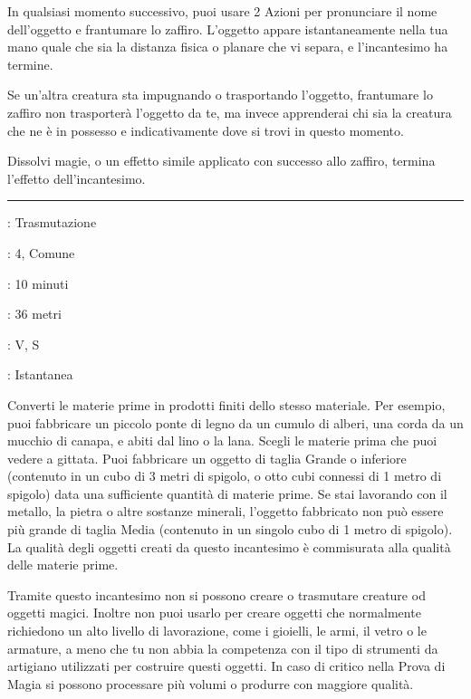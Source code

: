 \begin{multicols}{2}
In qualsiasi momento successivo, puoi usare 2 Azioni per pronunciare il nome dell'oggetto e frantumare lo zaffiro. L'oggetto appare istantaneamente nella tua mano quale che sia la distanza fisica o planare che vi separa, e l'incantesimo ha termine.

Se un'altra creatura sta impugnando o trasportando l'oggetto, frantumare lo zaffiro non trasporterà l'oggetto da te, ma invece apprenderai chi sia la creatura che ne è in possesso e indicativamente dove si trovi in questo momento.

Dissolvi magie, o un effetto simile applicato con successo allo zaffiro, termina l'effetto dell'incantesimo.

\smallskip\noindent\rule{\linewidth}{2pt} \hypertarget{Fabbricare}{}\medskip{}
\noindent
\begin{description}[noitemsep, topsep=0pt, parsep=0pt, partopsep=0pt, leftmargin=0cm, labelwidth=2.8cm]
	\item[\textbf{Lista di Magia}]: Trasmutazione
	\item[\textbf{Livello}]: 4, Comune
	\item[\textbf{T. di Lancio}]: 10 minuti
	\item[\textbf{Gittata}]: 36 metri
	\item[\textbf{Componenti}]: V, S
	\item[\textbf{Durata}]: Istantanea
\end{description}

Converti le materie prime in prodotti finiti dello stesso materiale. Per esempio, puoi fabbricare un piccolo ponte di legno da un cumulo di alberi, una corda da un mucchio di canapa, e abiti dal lino o la lana. Scegli le materie prima che puoi vedere a gittata. Puoi fabbricare un oggetto di taglia Grande o inferiore (contenuto in un cubo di 3 metri di spigolo, o otto cubi connessi di 1 metro di spigolo) data una sufficiente quantità di materie prime. Se stai lavorando con il metallo, la pietra o altre sostanze minerali, l'oggetto fabbricato non può essere più grande di taglia Media (contenuto in un singolo cubo di 1 metro di spigolo). La qualità degli oggetti creati da questo incantesimo è commisurata alla qualità delle materie prime.

Tramite questo incantesimo non si possono creare o trasmutare creature od oggetti magici. Inoltre non puoi usarlo per creare oggetti che normalmente richiedono un alto livello di lavorazione, come i gioielli, le armi, il vetro o le armature, a meno che tu non abbia la competenza con il tipo di strumenti da artigiano utilizzati per costruire questi oggetti. In caso di critico nella Prova di Magia si possono processare più volumi o produrre con maggiore qualità.


\end{multicols}
